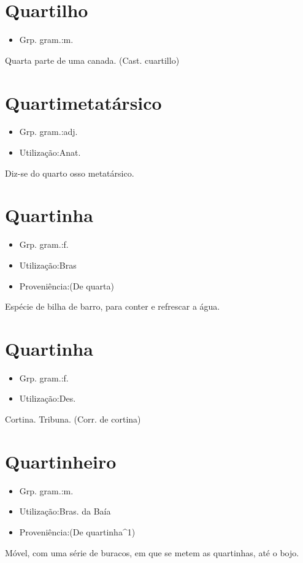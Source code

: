 \section{Quartilho}
\begin{itemize}
\item {Grp. gram.:m.}
\end{itemize}
Quarta parte de uma canada.
(Cast. \textunderscore cuartillo\textunderscore )
\section{Quartimetatársico}
\begin{itemize}
\item {Grp. gram.:adj.}
\end{itemize}
\begin{itemize}
\item {Utilização:Anat.}
\end{itemize}
Diz-se do quarto osso metatársico.
\section{Quartinha}
\begin{itemize}
\item {Grp. gram.:f.}
\end{itemize}
\begin{itemize}
\item {Utilização:Bras}
\end{itemize}
\begin{itemize}
\item {Proveniência:(De \textunderscore quarta\textunderscore )}
\end{itemize}
Espécie de bilha de barro, para conter e refrescar a água.
\section{Quartinha}
\begin{itemize}
\item {Grp. gram.:f.}
\end{itemize}
\begin{itemize}
\item {Utilização:Des.}
\end{itemize}
Cortina.
Tribuna.
(Corr. de \textunderscore cortina\textunderscore )
\section{Quartinheiro}
\begin{itemize}
\item {Grp. gram.:m.}
\end{itemize}
\begin{itemize}
\item {Utilização:Bras. da Baía}
\end{itemize}
\begin{itemize}
\item {Proveniência:(De \textunderscore quartinha\textunderscore ^1)}
\end{itemize}
Móvel, com uma série de buracos, em que se metem as quartinhas, até o bojo.
